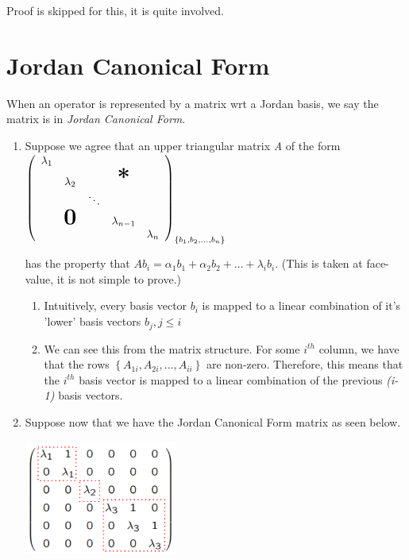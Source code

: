 \documentclass{article}
\begin{document}
Proof is skipped for this, it is quite involved.

\section{Jordan Canonical Form}
When an operator is represented by a matrix wrt a Jordan basis, we say the matrix is in \textit{Jordan Canonical Form}.

\begin{enumerate}[label*=\arabic*.]
    \item Suppose we agree that an upper triangular matrix \textit{A} of the form
        $
            \left(
            \begin{array}{ccccc}
            \lambda_{1}                              \\
            & \lambda_{2}     &   & \textbf{\huge *} \\
            &                 & \ddots               \\
            & \textbf{\huge0} &   & \lambda_{n-1}    \\
            &                 &   &   & \lambda_{n}
            \end{array}
            \right)_{\left\{ b_{1}, b_{2}, \dots, b_{n} \right\}}
        $ 

        has the property that $Ab_{i} = \alpha_{1}b_{1} + \alpha_{2}b_{2} + \dots + \lambda_{i}b_{i}$. (This is taken at face-value, it is not simple to prove.)
        \begin{enumerate}[label*=\arabic*.]
            \item Intuitively, every basis vector $b_{i}$ is mapped to a linear combination of it's 'lower' basis vectors $b_{j}, j \le i$
            \item We can see this from the matrix structure. For some $i^{th}$ column, we have that the rows $\left\{ A_{1i}, A_{2i}, \dots, A_{ii} \right\}$ are non-zero.
                    Therefore, this means that the $i^{th}$ basis vector is mapped to a linear combination of the previous \textit{(i-1)} basis vectors.
        \end{enumerate}
    \item Suppose now that we have the Jordan Canonical Form matrix as seen below.
    
    \begin{minipage}{\linewidth}
        \centering
        \includegraphics[width=5cm]{S1/jordanBasis2.PNG}
        \captionsetup{justification=centering}
    \end{minipage}%


\end{enumerate}
\end{document}
